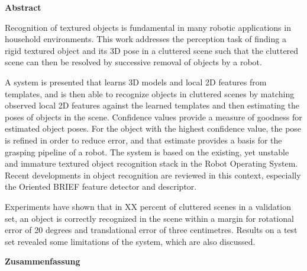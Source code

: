 

\clearemptydoublepage
{}
{}	

\vspace*{2cm}
\begin{center}
{\Large \bf Abstract}
\end{center}
\vspace{1cm}

Recognition of textured objects is fundamental in many robotic applications in
household environments. This work addresses the perception task of finding a
rigid textured object and its 3D pose in a cluttered scene such that the
cluttered scene can then be resolved by successive removal of objects by a
robot.

A system is presented that learns 3D models and local 2D features from
templates, and is then able to recognize objects in cluttered scenes by matching
observed local 2D features against the learned templates and then estimating
the poses of objects in the scene. Confidence values provide a measure of
goodness for estimated object poses. For the object with the highest confidence
value, the pose is refined in order to reduce error, and that estimate
provides a basis for the grasping pipeline of a robot. The system is based on
the existing, yet unstable and immature textured object recognition stack in
the Robot Operating System. Recent developments in object recognition are reviewed
in this context, especially the Oriented BRIEF feature detector and descriptor.

Experiments have shown that in XX percent of cluttered scenes in a validation
set, an object is correctly recognized in the scene within a margin for
rotational error of 20 degrees and translational error of three centimetres.
Results on a test set revealed some limitations of the system, which are also
discussed.

\clearemptydoublepage
{}
{}

\vspace*{2cm}
\begin{center}
{\Large \bf Zusammenfassung}
\end{center}
\vspace{1cm}


